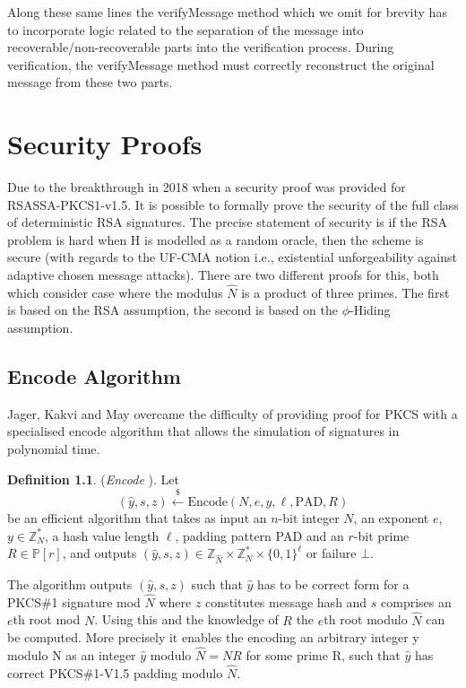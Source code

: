\documentclass[]{final_report}
\theoremstyle{definition}
\newtheorem{definition}{Definition}[chapter]
\begin{document}
Along these same lines the verifyMessage method which we omit for brevity has to incorporate logic related to the separation of the message into recoverable/non-recoverable parts into the verification process. During verification, the verifyMessage method must correctly reconstruct the original message from these two parts. 

\chapter{Security Proofs}
Due to the breakthrough in 2018 when a security proof \cite{jager2018security}  was provided for RSASSA-PKCS1-v1.5. It is possible to formally prove the security of the full class of deterministic RSA signatures. The precise statement of security is if the RSA problem is hard when H is modelled as a random oracle, then the scheme is secure (with regards to the UF-CMA notion i.e.,  existential unforgeability against adaptive chosen message attacks). There are two different proofs for this, both which consider case where the modulus $\widehat{N}$ is a product of three primes. The first is based on the RSA assumption, the second is based on the $\phi$-Hiding assumption.


\section{Encode Algorithm}


Jager, Kakvi and May overcame the difficulty of providing proof for PKCS with a specialised encode algorithm that allows the simulation of signatures in polynomial time.  

\begin{definition} (\textit{Encode} \cite{jager2018security}).
Let
\[
(\widehat{y}, s, z) \xleftarrow{\$} \text{Encode}(N, e, y, \ell, \text{PAD}, R)
\]
be an efficient algorithm that takes as input an \(n\)-bit integer \(N\), an exponent \(e\), \(y \in \mathbb{Z}_N^*\), a hash value length $\ell$, padding pattern PAD and an \(r\)-bit prime \(R \in \mathbb{P}[r]\), and outputs \((\widehat{y}, s, z) \in \mathbb{Z}_{\widehat{N}} \times \mathbb{Z}_N^* \times \{0, 1\}^\ell\) or failure \(\bot\). \

\end{definition}

The algorithm outputs \((\widehat{y}, s, z)\) such that \(\widehat{y}\) has to be correct form for a PKCS\#1 signature mod \(\widehat{N}\) where \(z\) constitutes message hash and \(s\) comprises an \(e\)th root mod \(N\). Using this and the knowledge of \(R\) the \(e\)th root modulo \(\widehat{N}\) can be computed. More precisely it enables the encoding an arbitrary integer y modulo N as an integer $\hat{y}$ modulo $\hat{N} = NR$ for some prime R, such that $\widehat{y}$ has correct PKCS\#1-V1.5 padding modulo $\hat{N}$.
\end{document}
